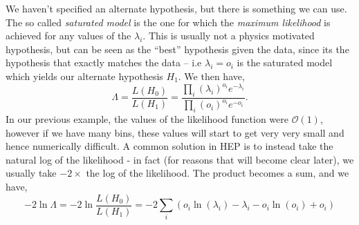 We haven't specified an alternate hypothesis, but there is something we can use. The so called \emph{saturated model} is the one for which the \emph{maximum likelihood} is achieved for any values of the $\lambda_{i}$. This is usually not a physics motivated hypothesis, but can be seen as the ``best'' hypothesis given the data, since its the hypothesis that exactly matches the data -- i.e $\lambda_{i}=o_{i}$ is the saturated model which yields our alternate hypothesis $H_1$. We then have, 
\begin{equation}
    \Lambda = \frac{L(H_0)}{L(H_1)} = \frac{\prod_{i} (\lambda_{i})^{o_{i}}e^{-\lambda_{i}}}{\prod_{i} (o_{i})^{o_{i}}e^{-o_{i}}}.
\end{equation}
In our previous example, the values of the likelihood function were $\mathcal{O}(1)$, however if we have many bins, these values will start to get very very small and hence numerically difficult. A common solution in HEP is to instead take the natural log of the likelihood - in fact (for reasons that will become clear later), we usually take $-2\times$ the log of the likelihood. The product becomes a sum, and we have, 
\begin{equation}
    -2\ln\Lambda = -2\ln\frac{L(H_0)}{L(H_1)} = -2\sum_{i} \left(o_{i}\ln(\lambda_{i}) -\lambda_{i}-o_{i}\ln(o_{i}) +o_{i} \right)
\end{equation}
